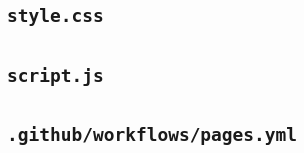 \documentclass[11pt]{article}
\begin{document}
\clearpage
\subsection{\texttt{style.css}}



\clearpage
\subsection{\texttt{script.js}}



\clearpage
\subsection{\texttt{.github/workflows/pages.yml}}


\end{document}
